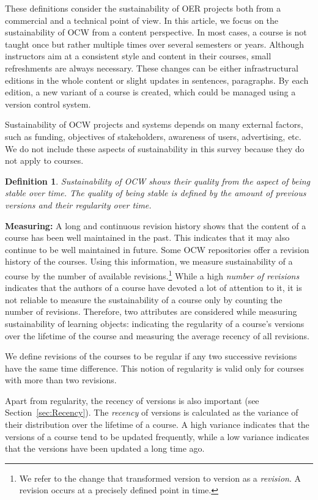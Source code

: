 \documentclass{sig-alternate}
\theoremstyle{definition}
\newtheorem{defn}{Definition}
\begin{document}
These definitions consider the sustainability of OER projects both from a commercial and a technical point of view.
In this article, we focus on the sustainability of OCW from a content perspective.
In most cases, a course is not taught once but rather multiple times over several semesters or years.
Although instructors aim at a consistent style and content in their courses, small refreshments are always necessary.
These changes can be either infrastructural editions in the whole content or slight updates in sentences, paragraphs.
By each edition, a new variant of a course is created, which could be managed using a version control system.

Sustainability of OCW projects and systems depends on many external factors, such as funding, objectives of stakeholders, awareness of users, advertising, etc.
We do not include these aspects of sustainability in this survey because they do not apply to courses.

\begin{defn}
\emph {Sustainability of OCW shows their quality from the aspect of being stable over time.
The quality of being stable is defined by the amount of previous versions and their regularity over time.}
\end{defn}

\noindent\textbf{Measuring:}
A long and continuous revision history shows that the content of a course has been well maintained in the past.
This indicates that it may also continue to be well maintained in future.
Some OCW repositories offer a revision history of the courses.
Using this information, we measure sustainability of a course by  the number of available revisions.\footnote{We refer to the change that transformed version  to version  as a \emph{revision}. A revision occurs at a precisely defined point in time.}
While a high \emph{number of revisions} indicates that the authors of a course have devoted a lot of attention to it, it is not reliable to measure the sustainability of a course only by counting the number of revisions.
Therefore, two attributes are considered while measuring sustainability of learning objects:
 indicating the regularity of a course's versions over the lifetime of the course and
 measuring the average recency of all revisions.

We define revisions of the courses to be regular if any two successive revisions have the same time difference.
This notion of regularity is valid only for courses with more than two revisions.


Apart from regularity, the recency of versions is also important (see Section~\ref{sec:Recency}).
The \emph{recency} of versions is calculated as the variance of their distribution over the lifetime of a course.
A high variance indicates that the versions of a course tend to be updated frequently, while a low variance indicates that the versions have been updated a long time ago.
\end{document}
